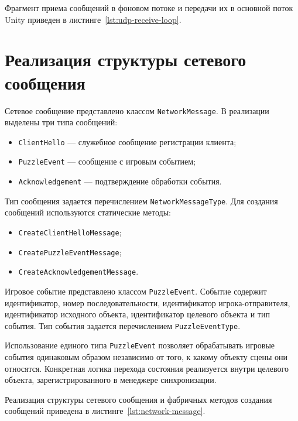 
Фрагмент приема сообщений в фоновом потоке и передачи их в основной поток Unity приведен в листинге~\ref{lst:udp-receive-loop}.


\section{Реализация структуры сетевого сообщения}

Сетевое сообщение представлено классом \texttt{NetworkMessage}. В реализации выделены три типа сообщений:
\begin{itemize}
	\item \texttt{ClientHello} --- служебное сообщение регистрации клиента;
	\item \texttt{PuzzleEvent} --- сообщение с игровым событием;
	\item \texttt{Acknowledgement} --- подтверждение обработки события.
\end{itemize}

Тип сообщения задается перечислением \texttt{NetworkMessageType}. Для создания сообщений используются статические методы:
\begin{itemize}
	\item \texttt{CreateClientHelloMessage};
	\item \texttt{CreatePuzzleEventMessage};
	\item \texttt{CreateAcknowledgementMessage}.
\end{itemize}

Игровое событие представлено классом \texttt{PuzzleEvent}. Событие содержит идентификатор, номер последовательности, идентификатор игрока-отправителя, идентификатор исходного объекта, 
идентификатор целевого объекта и тип события. Тип события задается перечислением \texttt{PuzzleEventType}.

Использование единого типа \texttt{PuzzleEvent} позволяет обрабатывать игровые события одинаковым образом независимо от того, к какому объекту сцены они относятся. Конкретная логика перехода состояния реализуется внутри целевого объекта, зарегистрированного в менеджере синхронизации.

Реализация структуры сетевого сообщения и фабричных методов создания сообщений приведена в листинге~\ref{lst:network-message}.

